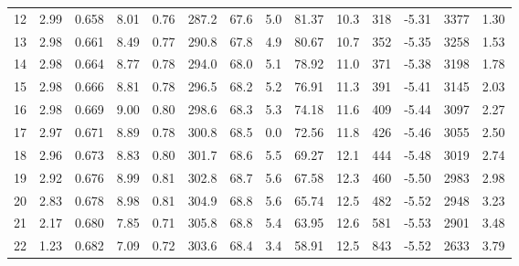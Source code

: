 \begin{table}
{\begin{minipage}{200mm}
\begin{tabular}{l l l l l l l l l l l l l l}
12	&	2.99	&	0.658	&	8.01	&	0.76	&	287.2	&	67.6	&	5.0	&	81.37	&	10.3	&	318	&	-5.31	&	3377	&	1.30\\
13	&	2.98	&	0.661	&	8.49	&	0.77	&	290.8	&	67.8	&	4.9	&	80.67	&	10.7	&	352	&	-5.35	&	3258	&	1.53\\
14	&	2.98	&	0.664	&	8.77	&	0.78	&	294.0	&	68.0	&	5.1	&	78.92	&	11.0	&	371	&	-5.38	&	3198	&	1.78\\
15	&	2.98	&	0.666	&	8.81	&	0.78	&	296.5	&	68.2	&	5.2	&	76.91	&	11.3	&	391	&	-5.41	&	3145	&	2.03\\
16	&	2.98	&	0.669	&	9.00	&	0.80	&	298.6	&	68.3	&	5.3	&	74.18	&	11.6	&	409	&	-5.44	&	3097	&	2.27\\
17	&	2.97	&	0.671	&	8.89	&	0.78	&	300.8	&	68.5	&	0.0	&	72.56	&	11.8	&	426	&	-5.46	&	3055	&	2.50\\
18	&	2.96	&	0.673	&	8.83	&	0.80	&	301.7	&	68.6	&	5.5	&	69.27	&	12.1	&	444	&	-5.48	&	3019	&	2.74\\
19	&	2.92	&	0.676	&	8.99	&	0.81	&	302.8	&	68.7	&	5.6	&	67.58	&	12.3	&	460	&	-5.50	&	2983	&	2.98\\
20	&	2.83	&	0.678	&	8.98	&	0.81	&	304.9	&	68.8	&	5.6	&	65.74	&	12.5	&	482	&	-5.52	&	2948	&	3.23\\
21	&	2.17	&	0.680	&	7.85	&	0.71	&	305.8	&	68.8	&	5.4	&	63.95	&	12.6	&	581	&	-5.53	&	2901	&	3.48\\
22	&	1.23	&	0.682	&	7.09	&	0.72	&	303.6	&	68.4	&	3.4	&	58.91	&	12.5	&	843	&	-5.52	&	2633	&	3.79\\
\hline
\end{tabular}
\end{minipage}}
\end{table}

